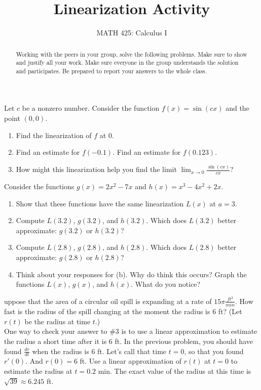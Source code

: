 \documentclass{ximera}
\title{Linearization Activity}
\author{MATH 425: Calculus I}
\begin{document}
\begin{abstract}
   Working with the peers in your group, solve the following problems. Make sure to show and justify all your work. Make sure everyone in the group understands the solution and participates. Be prepared to report your answers to the whole class. 
\end{abstract}
\maketitle


\begin{exercise}
   Let $c$ be a nonzero number. Consider the function $f(x)=\sin(cx)$ and the point $(0,0)$. \begin{enumerate}
       \item Find the linearization of $f$ at $0$.
        
       \item Find an estimate for $f(-0.1)$. Find an estimate for $f(0.123)$.
        
        \item How might this linearization help you find the limit $\lim_{x\to 0}\frac{\sin(cx)}{cx}$?
   \end{enumerate}
\end{exercise}
 
\begin{exercise}
   Consider the functions $g(x)=2x^{2}-7x$ and $h(x)=x^{3}-4x^{2}+2x$. 
   \begin{enumerate}
       \item Show that these functions have the same linearization $L(x)$ at $a=3$.
        
        \item Compute $L(3.2)$, $g(3.2)$, and $h(3.2)$. Which does $L(3.2)$ better approximate: $g(3.2)$ or $h(3.2)$?
        
       \item Compute $L(2.8)$, $g(2.8)$, and $h(2.8)$. Which does $L(2.8)$ better approximate: $g(2.8)$ or $h(2.8)$? 
        
       \item Think about your responses for (b). Why do think this occurs? Graph the functions $L(x)$, $g(x)$, and $h(x)$. What do you notice?
   \end{enumerate}
\end{exercise}

\begin{exercise}
   uppose that the area of a circular oil spill is expanding at a rate of $15\pi \frac{ft^2}{min}$.  How fast is the radius of the spill changing at the moment the radius is 6 ft? (Let $r(t)$ be the radius at time $t$.) \\

One way to check your answer  to \#3 is to use a linear approximation to estimate the radius a short time after it is 6 ft. In the previous problem, you should have found $\frac{dr}{dt}$ when the radius is $6$ ft. Let's call that time $t=0$, so that you found $r'(0).$ And $r(0)=6$ ft. Use a linear approximation of $r(t)$ at $t=0$ to estimate the radius at $t=0.2$ min. The exact value of the radius at this time is $\sqrt{39}\approx 6.245$ ft.
\end{exercise}
\end{document}
